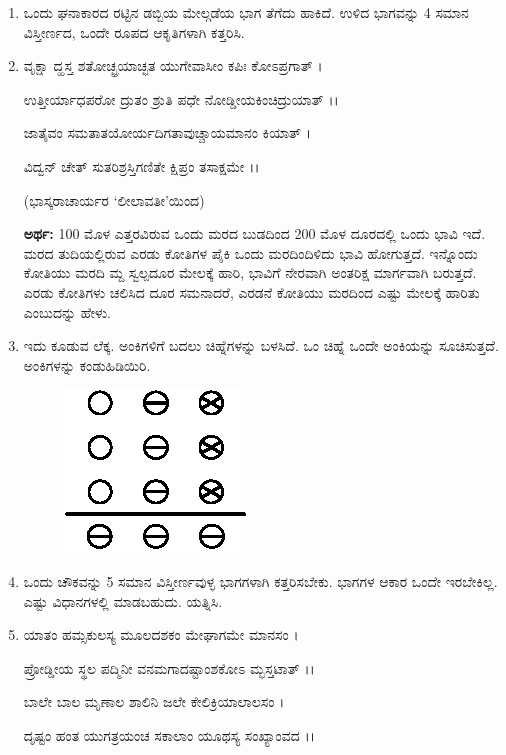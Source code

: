 \begin{enumerate}
\item ಒಂದು ಘನಾಕಾರದ ರಟ್ಟಿನ ಡಬ್ಬಿಯ ಮೇಲ್ಗಡೆಯ ಭಾಗ ತೆಗೆದು ಹಾಕಿದೆ. ಉಳಿದ ಭಾಗವನ್ನು 4 ಸಮಾನ ವಿಸ್ತೀರ್ಣದ, ಒಂದೇ ರೂಪದ ಆಕೃತಿಗಳಾಗಿ ಕತ್ತರಿಸಿ. 

\item ವೃಕ್ಷಾ ದ್ಹಸ್ತ ಶತೋಚ್ಛ್ರಯಾಚ್ಛತ ಯುಗೇವಾಸೀಂ ಕಪಿಃ ಕೋಽಪ್ರಗಾತ್ ।

ಉತ್ತೀರ್ಯಾಧಪರೋ ದ್ರುತಂ ಶ್ರುತಿ ಪಧೇ ನೋಡ್ಡೀಯಕಿಂಚಿದ್ರುಯಾತ್ ।।

ಜಾತೈವಂ ಸಮತಾತಯೋರ್ಯದಿಗತಾವುಚ್ಚಾಯಮಾನಂ ಕಿಯಾತ್ ।

ವಿದ್ವನ್ ಚೇತ್ ಸುತರಿಶ್ರಸ್ತಿಗಣಿತೇ ಕ್ಷಿಪ್ರಂ ತಸಾಕ್ಷಮೇ ।।

\smallskip

\hfill (ಭಾಸ್ಕರಾಚಾರ್ಯರ `ಲೀಲಾವತೀ'ಯಿಂದ)

\smallskip

{\bf ಅರ್ಥ:}  100 ಮೊಳ ಎತ್ತರವಿರುವ ಒಂದು ಮರದ ಬುಡದಿಂದ 200  ಮೊಳ ದೂರದಲ್ಲಿ ಒಂದು ಭಾವಿ ಇದೆ. ಮರದ ತುದಿಯಲ್ಲಿರುವ ಎರಡು ಕೋತಿಗಳ ಪೈಕಿ ಒಂದು ಮರದಿಂದಿಳಿದು ಭಾವಿ ಹೋಗುತ್ತದೆ. ಇನ್ನೊಂದು ಕೋತಿಯು ಮರದಿ ಮ್ದ ಸ್ವಲ್ಪದೂರ ಮೇಲಕ್ಕೆ ಹಾರಿ, ಭಾವಿಗೆ ನೇರವಾಗಿ ಅಂತರಿಕ್ಷ ಮಾರ್ಗವಾಗಿ ಬರುತ್ತದೆ. ಎರಡು ಕೋತಿಗಳು ಚಲಿಸಿದ ದೂರ ಸಮನಾದರೆ, ಎರಡನೆ ಕೋತಿಯು ಮರದಿಂದ ಎಷ್ಟು ಮೇಲಕ್ಕೆ ಹಾರಿತು ಎಂಬುದನ್ನು ಹೇಳು. 

\item ಇದು ಕೂಡುವ ಲೆಕ್ಕ. ಅಂಕಿಗಳಿಗೆ ಬದಲು ಚಿಹ್ನೆಗಳನ್ನು ಬಳಸಿದೆ. ಒಂ ಚಿಹ್ನೆ ಒಂದೇ ಅಂಕಿಯನ್ನು ಸೂಚಿಸುತ್ತದೆ. ಅಂಕಿಗಳನ್ನು ಕಂಡುಹಿಡಿಯಿರಿ. 
\begin{figure}[H]
\centering
\includegraphics{images/chap12/q24.eps}
\end{figure}


\item ಒಂದು ಚೌಕವನ್ನು 5 ಸಮಾನ ವಿಸ್ತೀರ್ಣವುಳ್ಳ ಭಾಗಗಳಾಗಿ ಕತ್ತರಿಸಬೇಕು. ಭಾಗಗಳ ಆಕಾರ ಒಂದೇ ಇರಬೇಕಿಲ್ಲ. ಎಷ್ಟು ವಿಧಾನಗಳಲ್ಲಿ ಮಾಡಬಹುದು. ಯತ್ನಿಸಿ.  

\item ಯಾತಂ ಹಮ್ಸಕುಲಸ್ಯ ಮೂಲದಶಕಂ ಮೇಘಾಗಮೇ ಮಾನಸಂ ।

ಪ್ರೋಡ್ಡೀಯ ಸ್ಥಲ ಪದ್ಮಿನೀ ವನಮಗಾದಷ್ಟಾಂಶಕೋಽ ಮ್ಭಸ್ತಟಾತ್ ।।

ಬಾಲೇ ಬಾಲ ಮೃಣಾಲ ಶಾಲಿನಿ ಜಲೇ ಕೇಲಿಕ್ರಿಯಾಲಾಲಸಂ ।

ದೃಷ್ಟಂ ಹಂತ ಯುಗತ್ರಯಂಚ ಸಕಾಲಾಂ ಯೂಥಸ್ಯ ಸಂಖ್ಯಾಂವದ ।।


\end{enumerate}
